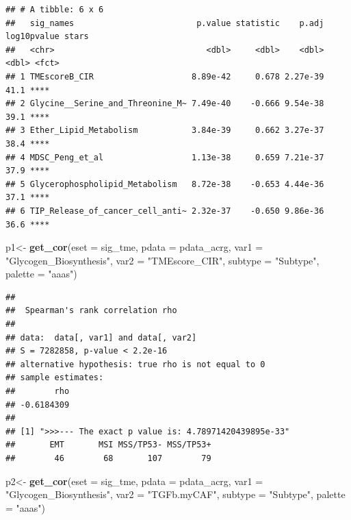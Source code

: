 \documentclass[
  12pt,
]{book}
\newenvironment{Shaded}{\begin{snugshade}}{\end{snugshade}}
\newcommand{\AttributeTok}[1]{\textcolor[rgb]{0.13,0.29,0.53}{#1}}
\newcommand{\FunctionTok}[1]{\textcolor[rgb]{0.13,0.29,0.53}{\textbf{#1}}}
\newcommand{\NormalTok}[1]{#1}
\newcommand{\OtherTok}[1]{\textcolor[rgb]{0.56,0.35,0.01}{#1}}
\newcommand{\StringTok}[1]{\textcolor[rgb]{0.31,0.60,0.02}{#1}}
\theoremstyle{definition}
\theoremstyle{definition}
\theoremstyle{definition}
\theoremstyle{definition}
\theoremstyle{remark}
\begin{document}
\begin{verbatim}
## # A tibble: 6 x 6
##   sig_names                         p.value statistic    p.adj log10pvalue stars
##   <chr>                               <dbl>     <dbl>    <dbl>       <dbl> <fct>
## 1 TMEscoreB_CIR                    8.89e-42     0.678 2.27e-39        41.1 **** 
## 2 Glycine__Serine_and_Threonine_M~ 7.49e-40    -0.666 9.54e-38        39.1 **** 
## 3 Ether_Lipid_Metabolism           3.84e-39     0.662 3.27e-37        38.4 **** 
## 4 MDSC_Peng_et_al                  1.13e-38     0.659 7.21e-37        37.9 **** 
## 5 Glycerophospholipid_Metabolism   8.72e-38    -0.653 4.44e-36        37.1 **** 
## 6 TIP_Release_of_cancer_cell_anti~ 2.32e-37    -0.650 9.86e-36        36.6 ****
\end{verbatim}

\begin{Shaded}
\begin{Highlighting}[]
\NormalTok{p1}\OtherTok{\textless{}{-}} \FunctionTok{get\_cor}\NormalTok{(}\AttributeTok{eset =}\NormalTok{ sig\_tme, }\AttributeTok{pdata =}\NormalTok{ pdata\_acrg, }\AttributeTok{var1 =} \StringTok{"Glycogen\_Biosynthesis"}\NormalTok{, }\AttributeTok{var2 =} \StringTok{"TMEscore\_CIR"}\NormalTok{, }\AttributeTok{subtype =} \StringTok{"Subtype"}\NormalTok{, }\AttributeTok{palette =} \StringTok{"aaas"}\NormalTok{)}
\end{Highlighting}
\end{Shaded}

\begin{verbatim}
## 
##  Spearman's rank correlation rho
## 
## data:  data[, var1] and data[, var2]
## S = 7282858, p-value < 2.2e-16
## alternative hypothesis: true rho is not equal to 0
## sample estimates:
##        rho 
## -0.6184309 
## 
## [1] ">>>--- The exact p value is: 4.78971420439895e-33"
##       EMT       MSI MSS/TP53- MSS/TP53+ 
##        46        68       107        79
\end{verbatim}

\begin{Shaded}
\begin{Highlighting}[]
\NormalTok{p2}\OtherTok{\textless{}{-}} \FunctionTok{get\_cor}\NormalTok{(}\AttributeTok{eset =}\NormalTok{ sig\_tme, }\AttributeTok{pdata =}\NormalTok{ pdata\_acrg, }\AttributeTok{var1 =} \StringTok{"Glycogen\_Biosynthesis"}\NormalTok{, }\AttributeTok{var2 =} \StringTok{"TGFb.myCAF"}\NormalTok{, }\AttributeTok{subtype =} \StringTok{"Subtype"}\NormalTok{, }\AttributeTok{palette =} \StringTok{"aaas"}\NormalTok{)}
\end{Highlighting}
\end{Shaded}
\end{document}
